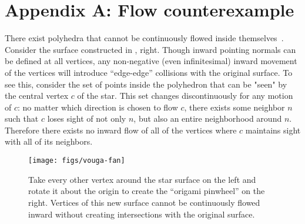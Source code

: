 \section*{Appendix A: Flow counterexample}
%
\label{app:counterexample}
%
There exist polyhedra that cannot be continuously flowed inside themselves~\cite{Mathoverflow:206750}.
%
Consider the surface constructed in , right. Though inward
pointing normals can be defined at all vertices, any non-negative (even
infinitesimal) inward movement of the vertices will introduce ``edge-edge''
collisions with the original surface.
%
To see this, consider the set of points inside the polyhedron that can be "seen" by the central vertex $c$ of the star. This set changes discontinuously for any motion of $c$: no matter which direction is chosen to flow $c$, there exists some neighbor $n$ such that $c$ loses sight of not only $n$, but also an entire neighborhood around $n$. Therefore there exists no inward flow of all of the vertices where $c$ maintains sight with all of its neighbors.
\begin{figure}[hb]
\texttt{[image: figs/vouga-fan]}
\caption{Take every other vertex around the star surface on the left and
rotate it about the origin to create the ``origami pinwheel'' on the right.
Vertices of this new surface cannot be continuously flowed inward without
creating intersections with the original surface.}
\label{fig:vouga-fan}
\end{figure}
